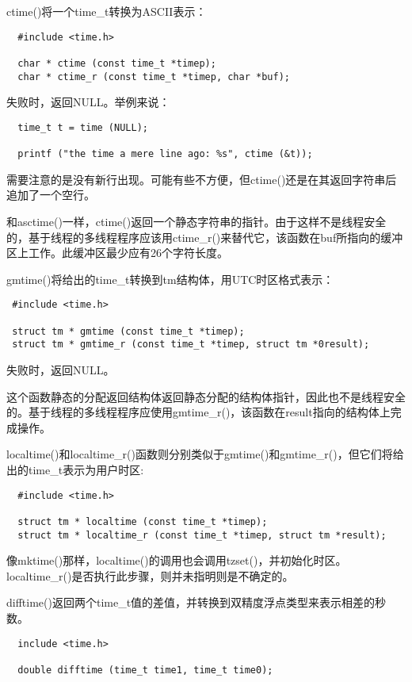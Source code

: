 ctime()将一个time\_t转换为ASCII表示： 

\begin{lstlisting}
  #include <time.h>

  char * ctime (const time_t *timep);
  char * ctime_r (const time_t *timep, char *buf);
\end{lstlisting}

失败时，返回NULL。举例来说：

\begin{lstlisting}
  time_t t = time (NULL);

  printf ("the time a mere line ago: %s", ctime (&t));
\end{lstlisting}

需要注意的是没有新行出现。可能有些不方便，但ctime()还是在其返回字符串后追加了一个空行。

和asctime()一样，ctime()返回一个静态字符串的指针。由于这样不是线程安全的，基于线程的多线程程序应该用ctime\_r()来替代它，该函数在buf所指向的缓冲区上工作。此缓冲区最少应有26个字符长度。 

gmtime()将给出的time\_t转换到tm结构体，用UTC时区格式表示： 

\begin{lstlisting}
 #include <time.h>

 struct tm * gmtime (const time_t *timep);
 struct tm * gmtime_r (const time_t *timep, struct tm *0result);
\end{lstlisting}

失败时，返回NULL。

这个函数静态的分配返回结构体返回静态分配的结构体指针，因此也不是线程安全的。基于线程的多线程程序应使用gmtime\_r()，该函数在result指向的结构体上完成操作。

localtime()和localtime\_r()函数则分别类似于gmtime()和gmtime\_r()，但它们将给出的time\_t表示为用户时区: 

\begin{lstlisting}
  #include <time.h>

  struct tm * localtime (const time_t *timep);
  struct tm * localtime_r (const time_t *timep, struct tm *result);
\end{lstlisting}

像mktime()那样，localtime()的调用也会调用tzset()，并初始化时区。localtime\_r()是否执行此步骤，则并未指明则是不确定的。

difftime()返回两个time\_t值的差值，并转换到双精度浮点类型来表示相差的秒数。 

\begin{lstlisting}
  include <time.h>

  double difftime (time_t time1, time_t time0);
\end{lstlisting}

